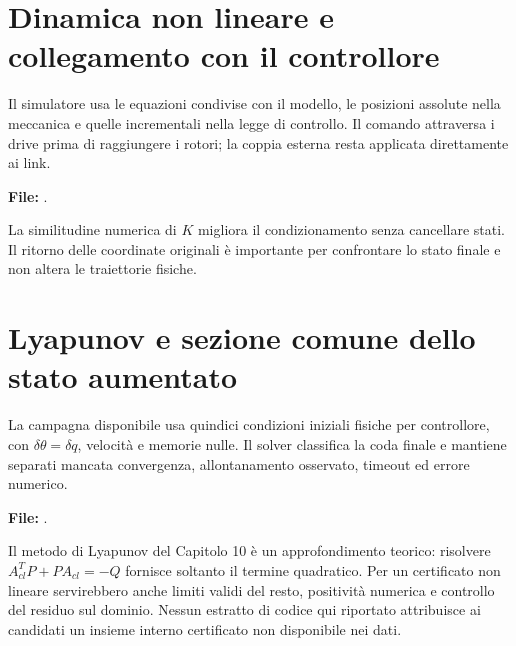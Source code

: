 \section{Dinamica non lineare e collegamento con il controllore}
Il simulatore usa le equazioni condivise con il modello, le posizioni
assolute nella meccanica e quelle incrementali nella legge di controllo.
Il comando attraversa i drive prima di raggiungere i rotori; la coppia
esterna resta applicata direttamente ai link.

\par\medskip\noindent\begin{minipage}{\linewidth}
\noindent\textbf{File:} .

\end{minipage}\par\medskip

La similitudine numerica di $K$ migliora il condizionamento senza
cancellare stati. Il ritorno delle coordinate originali è importante
per confrontare lo stato finale e non altera le traiettorie fisiche.

\section{Lyapunov e sezione comune dello stato aumentato}
La campagna disponibile usa quindici condizioni iniziali fisiche per
controllore, con $\delta\theta=\delta q$, velocità e memorie nulle.
Il solver classifica la coda finale e mantiene separati mancata
convergenza, allontanamento osservato, timeout ed errore numerico.

\par\medskip\noindent\begin{minipage}{\linewidth}
\noindent\textbf{File:} .

\end{minipage}\par\medskip

Il metodo di Lyapunov del Capitolo 10 è un approfondimento teorico:
risolvere $A_{cl}^TP+PA_{cl}=-Q$ fornisce soltanto il termine quadratico.
Per un certificato non lineare servirebbero anche limiti validi del resto,
positività numerica e controllo del residuo sul dominio. Nessun estratto
di codice qui riportato attribuisce ai candidati un insieme interno
certificato non disponibile nei dati.

